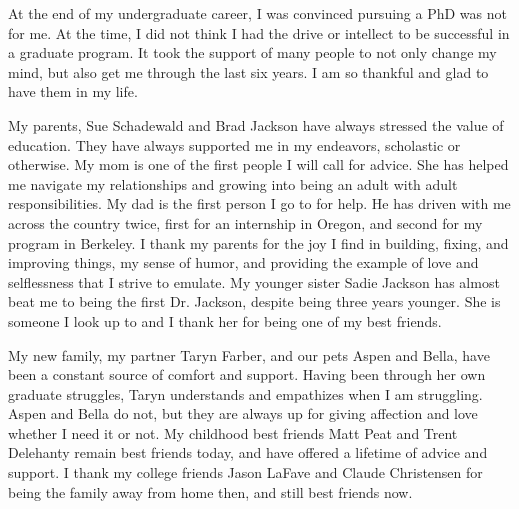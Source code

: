 
\begin{acknowledgements}
At the end of my undergraduate career, I was convinced pursuing a PhD was not for me. At the time, I did not think I had the drive or intellect to be successful in a graduate program. 
It took the support of many people to not only change my mind, but also get me through the last six years. 
I am so thankful and glad to have them in my life.

My parents, Sue Schadewald and Brad Jackson have always stressed the value of education. They have always supported me in my endeavors, scholastic or otherwise.
My mom is one of the first people I will call for advice.
She has helped me navigate my relationships and growing into being an adult with adult responsibilities.
My dad is the first person I go to for help. He has driven with me across the country twice, first for an internship in Oregon, and second for my program in Berkeley.
I thank my parents for the joy I find in building, fixing, and improving things, my sense of humor, and providing the example of love and selflessness that I strive to emulate.
My younger sister Sadie Jackson has almost beat me to being the first Dr. Jackson, despite being three years younger. 
She is someone I look up to and I thank her for being one of my best friends. 

My new family, my partner Taryn Farber, and our pets Aspen and Bella, have been a constant source of comfort and support.
Having been through her own graduate struggles, Taryn understands and empathizes when I am struggling.
Aspen and Bella do not, but they are always up for giving affection and love whether I need it or not.
My childhood best friends Matt Peat and Trent Delehanty remain best friends today, and have offered a lifetime of advice and support.
I thank my college friends Jason LaFave and Claude Christensen for being the family away from home then, and still best friends now.


\end{acknowledgements}
